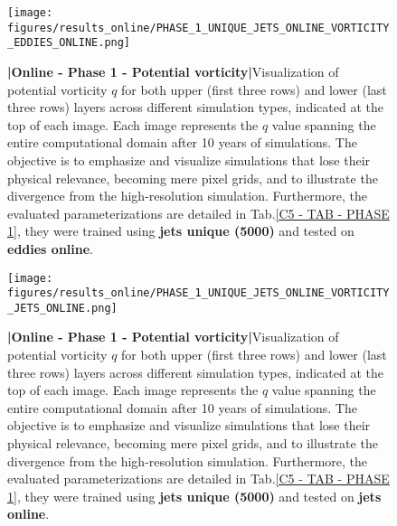 %
%
\newpage

\begin{figure}[H]
    \centering
    \texttt{[image: figures/results\_online/PHASE\_1\_UNIQUE\_JETS\_ONLINE\_VORTICITY\_EDDIES\_ONLINE.png]}
    \caption{\textbf{|}\textcolor{section_color}{\textbf{Online - Phase 1 - Potential vorticity}}\textbf{|}Visualization of potential vorticity $q$ for both upper (first three rows) and lower (last three rows) layers across different simulation types, indicated at the top of each image. Each image represents the $q$ value spanning the entire computational domain after 10 years of simulations. The objective is to emphasize and visualize simulations that lose their physical relevance, becoming mere pixel grids, and to illustrate the divergence from the high-resolution simulation. Furthermore, the evaluated parameterizations are detailed in Tab.\ref{C5 - TAB - PHASE 1}, they were trained using \textbf{jets unique (5000)} and tested on \textbf{eddies online}.}
    \label{APP - ONLINE - PHASE 1 - VORTICITY -  JETS UNIQUE 5000 and EDDIES ONLINE}
\end{figure}

\newpage

\begin{figure}[H]
    \centering
    \texttt{[image: figures/results\_online/PHASE\_1\_UNIQUE\_JETS\_ONLINE\_VORTICITY\_JETS\_ONLINE.png]}
    \caption{\textbf{|}\textcolor{section_color}{\textbf{Online - Phase 1 - Potential vorticity}}\textbf{|}Visualization of potential vorticity $q$ for both upper (first three rows) and lower (last three rows) layers across different simulation types, indicated at the top of each image. Each image represents the $q$ value spanning the entire computational domain after 10 years of simulations. The objective is to emphasize and visualize simulations that lose their physical relevance, becoming mere pixel grids, and to illustrate the divergence from the high-resolution simulation. Furthermore, the evaluated parameterizations are detailed in Tab.\ref{C5 - TAB - PHASE 1}, they were trained using \textbf{jets unique (5000)} and tested on \textbf{jets online}.}
    \label{APP - ONLINE - PHASE 1 - VORTICITY -  JETS UNIQUE 5000 and JETS ONLINE}
\end{figure}
